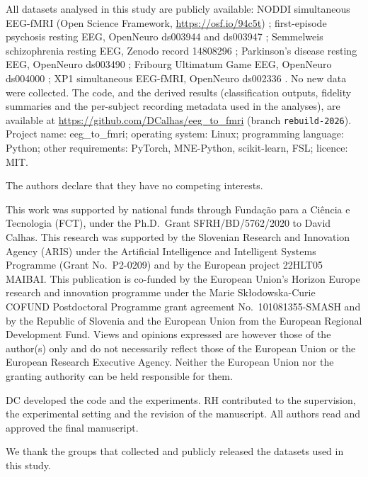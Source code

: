 \documentclass[pdflatex,referee,sn-basic]{sn-jnl}%
\begin{document}
All datasets analysed in this study are publicly available: NODDI simultaneous EEG-fMRI (Open Science Framework, \url{https://osf.io/94c5t}) \cite{dataset_01}; first-episode psychosis resting EEG, OpenNeuro ds003944 and ds003947 \cite{salisbury_ds003944,salisbury_ds003947}; Semmelweis schizophrenia resting EEG, Zenodo record 14808296 \cite{racz2025}; Parkinson's disease resting EEG, OpenNeuro ds003490 \cite{cavanagh_ds003490}; Fribourg Ultimatum Game EEG, OpenNeuro ds004000 \cite{dataset2022fribourg}; XP1 simultaneous EEG-fMRI, OpenNeuro ds002336 \cite{lioi2020xp}. No new data were collected. The code, and the derived results (classification outputs, fidelity summaries and the per-subject recording metadata used in the analyses), are available at \url{https://github.com/DCalhas/eeg_to_fmri} (branch \texttt{rebuild-2026}). Project name: eeg\_to\_fmri; operating system: Linux; programming language: Python; other requirements: PyTorch, MNE-Python, scikit-learn, FSL; licence: MIT.

The authors declare that they have no competing interests.

This work was supported by national funds through Funda\c{c}\~{a}o para a Ci\^{e}ncia e Tecnologia (FCT), under the Ph.D.\ Grant SFRH/BD/5762/2020 to David Calhas. This research was supported by the Slovenian Research and Innovation Agency (ARIS) under the Artificial Intelligence and Intelligent Systems Programme (Grant No.~P2-0209) and by the European project 22HLT05 MAIBAI. This publication is co-funded by the European Union's Horizon Europe research and innovation programme under the Marie Sk{\l}odowska-Curie COFUND Postdoctoral Programme grant agreement No.~101081355-SMASH and by the Republic of Slovenia and the European Union from the European Regional Development Fund. Views and opinions expressed are however those of the author(s) only and do not necessarily reflect those of the European Union or the European Research Executive Agency. Neither the European Union nor the granting authority can be held responsible for them.

DC developed the code and the experiments. RH contributed to the supervision, the experimental setting and the revision of the manuscript. All authors read and approved the final manuscript.

We thank the groups that collected and publicly released the datasets used in this study.


\end{document}
